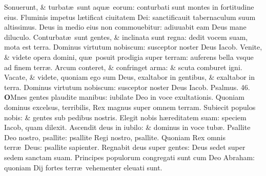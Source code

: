 \documentclass[a5paper,10pt]{book}
\def\ae{æ}
\begin{document}
\begin{multicols*}{2}
\newline \color{red} S\color{black}onuerunt, \& turbat\ae \ sunt aqu\ae \ eorum: conturbati sunt montes in fortitudine eius.
\newline \color{red} F\color{black}luminis impetus l\ae tificat ciuitatem Dei: sanctificauit tabernaculum suum altissimus.
\newline \color{red} D\color{black}eus in medio eius non commouebitur: adiuuabit eam Deus mane diluculo.
\newline \color{red} C\color{black}onturbat\ae \ sunt gentes, \& inclinata sunt regna: dedit vocem suam, mota est terra.
\newline \color{red} D\color{black}ominus virtutum nobiscum: susceptor noster Deus Iacob.
\newline \color{red} V\color{black}enite, \& videte opera domini, qu\ae \ posuit prodigia super terram: auferens bella vsque ad finem terr\ae .
\newline \color{red} A\color{black}rcum conteret, \& confringet arma: \& scuta comburet igni.
\newline \color{red} V\color{black}acate, \& videte, quoniam ego sum Deus, exaltabor in gentibus, \& exaltabor in terra.
\newline \color{red} D\color{black}ominus virtutum nobiscum: susceptor noster Deus Iacob. \quad \color{red} Psalmus. \hypertarget{ps46}{46.} \color{black}
\vspace{-1.5em}
\lettrine[lines=2]{\bfseries \color{red} O}{}Mnes gentes plaudite manibus: iubilate Deo in voce exultationis.
\newline \color{red} Q\color{black}uoniam dominus excelsus, terribilis, Rex magnus super omnem terram.
\newline \color{red} S\color{black}ubiecit populos nobis: \& gentes sub pedibus nostris.
\newline \color{red} E\color{black}legit nobis h\ae reditatem suam: speciem Iacob, quam dilexit.
\newline \color{red} A\color{black}scendit deus in iubilo: \& dominus in voce tub\ae .
\newline \color{red} P\color{black}sallite Deo nostro, psallite: psallite Regi nostro, psallite.
\newline \color{red} Q\color{black}uoniam Rex omnis terr\ae \ Deus: psallite sapienter.
\newline \color{red} R\color{black}egnabit deus super gentes: Deus sedet super sedem sanctam suam.
\newline \color{red} P\color{black}rincipes populorum congregati sunt cum Deo Abraham: quoniam Dij fortes terr\ae \ vehementer eleuati sunt.

\end{multicols*}
\end{document}
